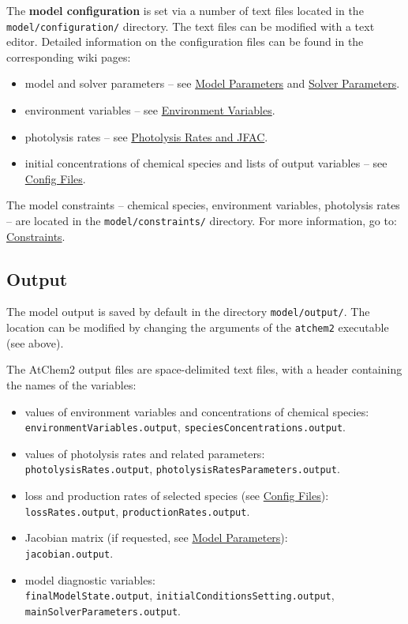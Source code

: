 The \textbf{model configuration} is set via a number of text files
located in the \texttt{model/configuration/} directory. The text files
can be modified with a text editor. Detailed information on the
configuration files can be found in the corresponding wiki pages:

\begin{itemize}
\item model and solver parameters -- see
  \hyperref[sec:model-parameters]{Model Parameters} and
  \hyperref[sec:solver-parameters]{Solver Parameters}.
\item environment variables -- see \hyperref[sec:environment-variables]{Environment
    Variables}.
\item photolysis rates -- see \hyperref[sec:photolysis-rates]{Photolysis
    Rates and JFAC}.
\item initial concentrations of chemical species and lists of output
  variables -- see \hyperref[sec:config-files]{Config Files}.
\end{itemize}

The model constraints -- chemical species, environment variables,
photolysis rates -- are located in the \texttt{model/constraints/}
directory. For more information, go to:
\hyperref[sec:constraints]{Constraints}.

\subsection{Output} \label{subsec:output}

The model output is saved by default in the directory
\texttt{model/output/}. The location can be modified by changing the
arguments of the \texttt{atchem2} executable (see above).

The AtChem2 output files are space-delimited text files, with a header
containing the names of the variables:

\begin{itemize}
\item values of environment variables and concentrations of chemical
  species:\\ \texttt{environmentVariables.output},
  \texttt{speciesConcentrations.output}.
\item values of photolysis rates and related parameters:\\
  \texttt{photolysisRates.output},
  \texttt{photolysisRatesParameters.output}.
\item loss and production rates of selected species (see
  \hyperref[sec:config-files]{Config Files}):\\ \texttt{lossRates.output},
  \texttt{productionRates.output}.
\item Jacobian matrix (if requested, see
  \hyperref[sec:model-parameters]{Model Parameters}):\\
  \texttt{jacobian.output}.
\item model diagnostic variables:\\ \texttt{finalModelState.output},
  \texttt{initialConditionsSetting.output},
  \texttt{mainSolverParameters.output}.
\end{itemize}


